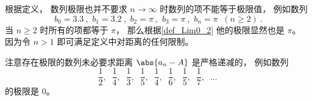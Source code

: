 \begin{example}{}
根据定义， 数列极限也并不要求 $n\to \infty$ 时数列的项不能等于极限值， 例如数列
\begin{equation}
b_0 = 3.3~,\,\, b_1 = 3.2~, \,\, b_2 = \pi~, \,\, b_3 = \pi~, \,\, b_n = \pi \;\; (n \ge 2)~.
\end{equation}
当 $n \ge 2$ 时所有的项都等于 $\pi$， 那么根据\autoref{def_Lim0_2} 他的极限显然也是 $\pi$。 因为令 $n > 1$ 即可满足定义中对距离的任何限制。
\end{example}

\begin{example}{}
注意存在极限的数列未必要求距离 $\abs{a_n - A}$ 是严格递减的， 例如数列
\begin{equation}
\frac{1}{2},\;\; \frac{1}{4},\;\; \frac{1}{3},\;\; \frac{1}{5},\;\; \frac{1}{4},\;\; \frac{1}{6},\;\; \frac{1}{5},\;\; \frac{1}{7},\;\; \dots~
\end{equation}
的极限是 $0$。
\end{example}
